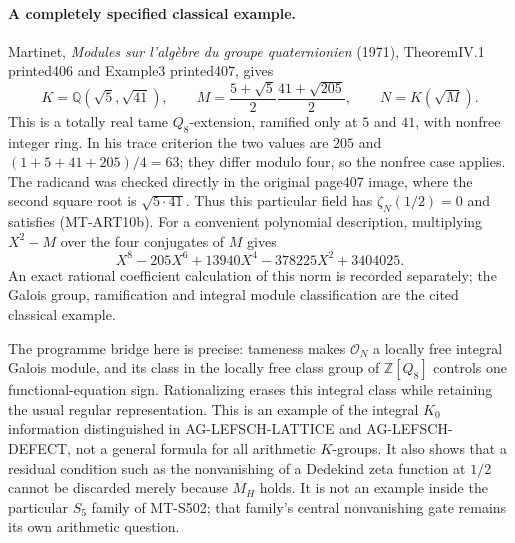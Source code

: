 \documentclass[11pt,a4paper]{article}
\begin{document}
\paragraph{A completely specified classical example.}
Martinet, \emph{Modules sur l'alg\`ebre du groupe quaternionien}
(1971), TheoremIV.1 printed406 and Example3 printed407, gives
\[
 K=\mathbb Q(\sqrt5,\sqrt{41}),\qquad
 M=\frac{5+\sqrt5}{2}\frac{41+\sqrt{205}}{2},\qquad
 N=K(\sqrt M).
 \tag{MT-ART10c}
\]
This is a totally real tame $Q_8$-extension, ramified only at
$5$ and $41$, with nonfree integer ring. In his trace criterion
the two values are $205$ and $(1+5+41+205)/4=63$; they differ
modulo four, so the nonfree case applies. The radicand was
checked directly in the original page407 image, where the
second square root is $\sqrt{5\cdot41}$.
Thus this particular field has $\zeta_N(1/2)=0$ and satisfies
(MT-ART10b). For a convenient polynomial description, multiplying
$X^2-M$ over the four conjugates of $M$ gives
\[
 X^8-205X^6+13940X^4-378225X^2+3404025.
 \tag{MT-ART10d}
\]
An exact rational coefficient calculation of this norm is
recorded separately; the Galois group, ramification and integral
module classification are the cited classical example.

The programme bridge here is precise: tameness makes
$\mathcal O_N$ a locally free integral Galois module, and its
class in the locally free class group of $\mathbb Z[Q_8]$
controls one functional-equation sign. Rationalizing erases
this integral class while retaining the usual regular
representation. This is an example of the integral $K_0$
information distinguished in AG-LEFSCH-LATTICE and
AG-LEFSCH-DEFECT, not a general formula for all arithmetic
$K$-groups. It also shows that a residual condition such as
the nonvanishing of a Dedekind zeta function at $1/2$ cannot
be discarded merely because $M_H$ holds. It is not an example
inside the particular $S_5$ family of MT-S502; that family's
central nonvanishing gate remains its own arithmetic question.
\end{document}
